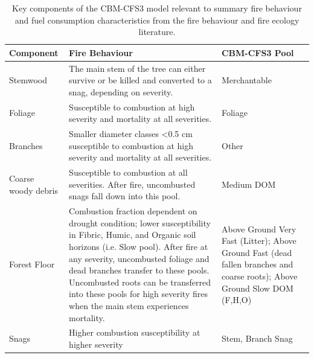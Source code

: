 \documentclass[, manuscript]{copernicus}
\begin{document}
\begin{table}
\centering
\caption{\label{tab:CBM-pools-simple-table}Key components of the CBM-CFS3 model relevant to summary fire behaviour and fuel consumption characteristics from the fire behaviour and fire ecology literature.}
\centering
\begin{tabular}[t]{>{\centering\arraybackslash}p{3cm}|>{\centering\arraybackslash}p{6cm}|>{\centering\arraybackslash}p{3cm}}
\hline
Component & Fire Behaviour & CBM-CFS3 Pool\\
\hline
Stemwood & The main stem of the tree can either survive or be killed and converted to a snag, depending on severity. & Merchantable\\
\hline
Foliage & Susceptible to combustion at high severity and mortality at all severities. & Foliage\\
\hline
Branches & Smaller diameter classes <0.5 cm susceptible to combustion at high severity and mortality at all severities. & Other\\
\hline
Coarse woody debris & Susceptible to combustion at all severities. After fire, uncombusted snags fall down into this pool. & Medium DOM\\
\hline
Forest Floor & Combustion fraction dependent on drought condition; lower susceptibility in Fibric, Humic, and Organic soil horizons (i.e. Slow pool). After fire at any severity, uncombusted foliage and dead branches transfer to these pools. Uncombusted roots can be transferred into these pools for high severity fires when the main stem experiences mortality. & Above Ground Very Fast (Litter); Above Ground Fast (dead fallen branches and coarse roots); Above Ground Slow DOM (F,H,O)\\
\hline
Snags & Higher combustion susceptibility at higher severity & Stem, Branch Snag\\
\hline
\end{tabular}
\end{table}
\end{document}
